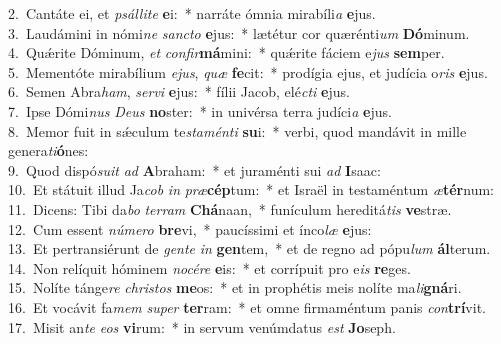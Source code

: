 {2.~}Cantáte ei, et \textit{psál}\textit{li}\textit{te} \textbf{e}i:~* narráte ómnia mirabíli\textit{a} \textbf{e}jus.\\
{3.~}Laudámini in nómi\textit{ne} \textit{san}\textit{cto} \textbf{e}jus:~* lætétur cor quærénti\textit{um} \textbf{Dó}minum.\\
{4.~}Quǽrite Dóminum, \textit{et} \textit{con}\textit{fir}\textbf{má}mini:~* quǽrite fáciem e\textit{jus} \textbf{sem}per.\\
{5.~}Mementóte mirabílium \textit{e}\textit{jus}, \textit{quæ} \textbf{fe}cit:~* prodígia ejus, et judícia o\textit{ris} \textbf{e}jus.\\
{6.~}Semen Abra\textit{ham}, \textit{ser}\textit{vi} \textbf{e}jus:~* fílii Jacob, elé\textit{cti} \textbf{e}jus.\\
{7.~}Ipse Dómi\textit{nus} \textit{De}\textit{us} \textbf{no}ster:~* in univérsa terra judíci\textit{a} \textbf{e}jus.\\
{8.~}Memor fuit in sǽculum te\textit{sta}\textit{mén}\textit{ti} \textbf{su}i:~* verbi, quod mandávit in mille genera\textit{ti}\textbf{ó}nes:\\
{9.~}Quod dispó\textit{su}\textit{it} \textit{ad} \textbf{A}braham:~* et juraménti sui \textit{ad} \textbf{I}saac:\\
{10.~}Et státuit illud Ja\textit{cob} \textit{in} \textit{præ}\textbf{cép}tum:~* et Israël in testaméntum \textit{æ}\textbf{tér}num:\\
{11.~}Dicens: Tibi da\textit{bo} \textit{ter}\textit{ram} \textbf{Chá}naan,~* funículum hereditá\textit{tis} \textbf{ve}stræ.\\
{12.~}Cum essent \textit{nú}\textit{me}\textit{ro} \textbf{bre}vi,~* paucíssimi et ínco\textit{læ} \textbf{e}jus:\\
{13.~}Et pertransiérunt de \textit{gen}\textit{te} \textit{in} \textbf{gen}tem,~* et de regno ad pópu\textit{lum} \textbf{ál}terum.\\
{14.~}Non relíquit hóminem \textit{no}\textit{cé}\textit{re} \textbf{e}is:~* et corrípuit pro e\textit{is} \textbf{re}ges.\\
{15.~}Nolíte tánge\textit{re} \textit{chri}\textit{stos} \textbf{me}os:~* et in prophétis meis nolíte ma\textit{li}\textbf{gná}ri.\\
{16.~}Et vocávit fa\textit{mem} \textit{su}\textit{per} \textbf{ter}ram:~* et omne firmaméntum panis \textit{con}\textbf{trí}vit.\\
{17.~}Misit an\textit{te} \textit{e}\textit{os} \textbf{vi}rum:~* in servum venúmdatus \textit{est} \textbf{Jo}seph.\\
